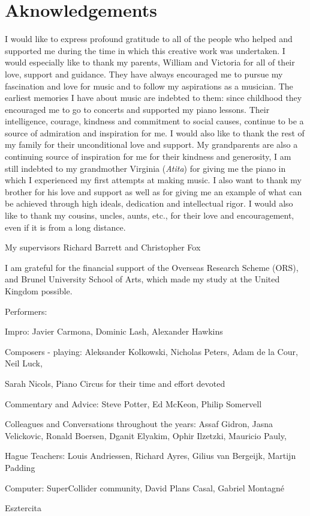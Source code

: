 \chapter*{Aknowledgements}

I would like to express profound gratitude to all of the people who helped and supported me during the time in which this creative work was undertaken. I would especially like to thank my parents, William and Victoria for all of their love, support and guidance. They have always encouraged me to pursue my fascination and love for music and to follow my aspirations as a musician. The earliest memories I have about music are indebted to them: since childhood they encouraged me to go to concerts and supported my piano lessons. Their intelligence, courage, kindness and commitment to social causes, continue to be a source of admiration and inspiration for me. I would also like to thank the rest of my family for their unconditional love and support. My grandparents are also a continuing source of inspiration for me for their kindness and generosity, I am still indebted to my grandmother Virginia (\emph{Atita}) for giving me the piano in which I experienced my first attempts at making music. I also want to thank my brother for his love and support as well as for giving me an example of what can be achieved through high ideals, dedication and intellectual rigor. I would also like to thank my cousins, uncles, aunts, etc., for their love and encouragement, even if it is from a long distance.

My supervisors Richard Barrett and Christopher Fox

I am grateful for the financial support of the Overseas Research Scheme (ORS), and Brunel University School of Arts, which made my study at the United Kingdom possible.


Performers: 

Impro: Javier Carmona, Dominic Lash, Alexander Hawkins

Composers - playing: Aleksander Kolkowski, Nicholas Peters, Adam de la Cour, Neil Luck, 

Sarah Nicols, Piano Circus for their time and effort devoted

Commentary and Advice: Steve Potter, Ed McKeon, Philip Somervell

Colleagues and Conversations throughout the years:  Assaf Gidron, Jasna Velickovic, Ronald Boersen, Dganit Elyakim, Ophir Ilzetzki, Mauricio Pauly, 

Hague Teachers: Louis Andriessen, Richard Ayres, Gilius van Bergeijk, Martijn Padding

Computer: SuperCollider community, David Plans Casal, Gabriel Montagn\'e

Esztercita
